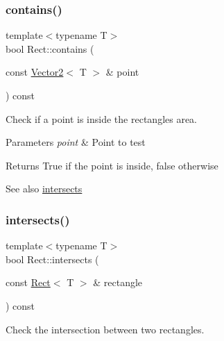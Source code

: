 \subsubsection{\texorpdfstring{contains()}{contains()}\hspace{0.1cm}{\footnotesize\ttfamily [2/2]}}
{\footnotesize\ttfamily template$<$typename T$>$ \\
bool Rect\+::contains (\begin{DoxyParamCaption}\item[{const \hyperlink{classsf_1_1_vector2}{Vector2}$<$ T $>$ \&}]{point }\end{DoxyParamCaption}) const}



Check if a point is inside the rectangle\textquotesingle{}s area. 


\begin{DoxyParams}{Parameters}
{\em point} & Point to test\\
\hline
\end{DoxyParams}
\begin{DoxyReturn}{Returns}
True if the point is inside, false otherwise
\end{DoxyReturn}
\begin{DoxySeeAlso}{See also}
\hyperlink{classsf_1_1_rect_ad90321b1135cad31589f2db2f9b772db}{intersects} 
\end{DoxySeeAlso}
\mbox{\label{classsf_1_1_rect_ad90321b1135cad31589f2db2f9b772db}} 
\subsubsection{\texorpdfstring{intersects()}{intersects()}\hspace{0.1cm}{\footnotesize\ttfamily [1/2]}}
{\footnotesize\ttfamily template$<$typename T$>$ \\
bool Rect\+::intersects (\begin{DoxyParamCaption}\item[{const \hyperlink{classsf_1_1_rect}{Rect}$<$ T $>$ \&}]{rectangle }\end{DoxyParamCaption}) const}



Check the intersection between two rectangles. 


